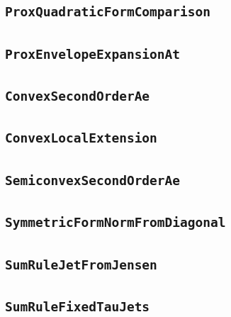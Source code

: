 \documentclass[11pt]{amsart}
\theoremstyle{definition}
\begin{document}
\subsection{\texorpdfstring{\texttt{ProxQuadraticFormComparison}}{ProxQuadraticFormComparison}}\label{node:ProxQuadraticFormComparison}


\subsection{\texorpdfstring{\texttt{ProxEnvelopeExpansionAt}}{ProxEnvelopeExpansionAt}}\label{node:ProxEnvelopeExpansionAt}


\subsection{\texorpdfstring{\texttt{ConvexSecondOrderAe}}{ConvexSecondOrderAe}}\label{node:ConvexSecondOrderAe}


\subsection{\texorpdfstring{\texttt{ConvexLocalExtension}}{ConvexLocalExtension}}\label{node:ConvexLocalExtension}


\subsection{\texorpdfstring{\texttt{SemiconvexSecondOrderAe}}{SemiconvexSecondOrderAe}}\label{node:SemiconvexSecondOrderAe}


\subsection{\texorpdfstring{\texttt{SymmetricFormNormFromDiagonal}}{SymmetricFormNormFromDiagonal}}\label{node:SymmetricFormNormFromDiagonal}


\subsection{\texorpdfstring{\texttt{SumRuleJetFromJensen}}{SumRuleJetFromJensen}}\label{node:SumRuleJetFromJensen}


\subsection{\texorpdfstring{\texttt{SumRuleFixedTauJets}}{SumRuleFixedTauJets}}\label{node:SumRuleFixedTauJets}

\end{document}
